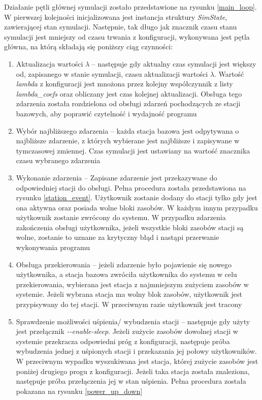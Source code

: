 \noindent Działanie pętli głównej symulacji zostało przedstawione na rysunku \ref{main_loop}. W pierwszej kolejności inicjalizowana jest instancja struktury \emph{SimState}, zawierającej stan symulacji. Następnie, tak długo jak znacznik czasu stanu symulacji jest mniejszy od czasu trwania z konfiguracji, wykonywana jest pętla główna, na którą składają się poniższy ciąg czynności:
\begin{enumerate}
\item Aktualizacja wartości $\lambda$ -- następuje gdy aktualny czas symulacji jest większy od, zapisanego w stanie symulacji, czasu aktualizacji wartości $\lambda$. Wartość \emph{lambda} z konfiguracji jest mnożona przez kolejny współczynnik z listy \emph{lambda\_coefs} oraz obliczany jest czas kolejnej aktualizacji. Obsługa tego zdarzenia została rozdzielona od obsługi zdarzeń pochodzących ze stacji bazowych, aby poprawić czytelność i wydajność programu
\item Wybór najbliższego zdarzenia -- każda stacja bazowa jest odpytywana o najbliższe zdarzenie, z których wybierane jest najbliższe i zapisywane w tymczasowej zmiennej. Czas symulacji jest ustawiany na wartość znacznika czasu wybranego zdarzenia
\item Wykonanie zdarzenia -- Zapisane zdarzenie jest przekazywane do odpowiedniej stacji do obsługi. Pełna procedura została przedstawiona na rysunku \ref{station_event}. Użytkownik zostanie dodany do stacji tylko gdy jest ona aktywna oraz posiada wolne bloki zasobów. W każdym innym przypadku użytkownik zostanie zwrócony do systemu. W przypadku zdarzenia zakończenia obsługi użytkownika, jeżeli wszystkie bloki zasobów stacji są wolne, zostanie to uznane za krytyczny błąd i nastąpi przerwanie wykonywania programu
\item Obsługa przekierowania -- jeżeli zdarzenie było pojawienie się nowego użytkownika, a stacja bazowa zwróciła użytkownika do systemu w celu przekierowania, wybierana jest stacja z najmniejszym zużyciem zasobów w systemie. Jeżeli wybrana stacja ma wolny blok zasobów, użytkownik jest przypisywany do tej stacji. W przeciwnym razie użytkownik jest tracony
\item Sprawdzenie możliwości uśpienia/ wybudzenia stacji -- następuje gdy użyty jest przełącznik \emph{-{}-enable-sleep}. Jeżeli zużycie zasobów dowolnej stacji w systemie przekracza odpowiedni próg z konfiguracji, następuje próba wybudzenia jednej z uśpionych stacji i przekazania jej połowy użytkowników. W przeciwnym wypadku wyszukiwana jest stacja, której zużycie zasobów jest poniżej drugiego progu z konfiguracji. Jeżeli taka stacja została znaleziona, następuje próba przełączenia jej w stan uśpienia. Pełna procedura została pokazana na rysunku \ref{power_up_down}
\end{enumerate}

